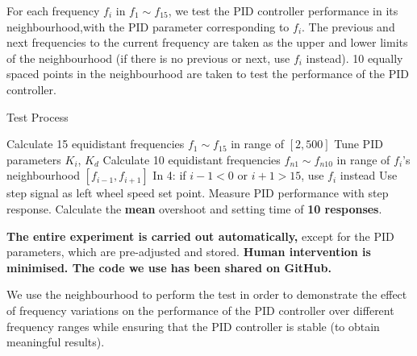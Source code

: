 \documentclass[conference]{IEEEtran}
\begin{document}

For each frequency $f_{i}$ in $f_{1}\sim f_{15}$, we test the PID controller performance in its neighbourhood,with the PID parameter corresponding to $f_{i}$. The previous and next frequencies to the current frequency are taken as the upper and lower limits of the neighbourhood (if there is no previous or next, use $f_{i}$ instead). 10 equally spaced points in the neighbourhood are taken to test the performance of the PID controller.

\begin{algorithm}
	\caption{Test Process}\label{TestMethod}
	\begin{algorithmic}[1]
        \State Calculate 15  equidistant frequencies $f_{1}\sim f_{15}$ in range of $[2,500]$
                \State Tune PID parameters $K_{i}$, $K_{d}$
                \State Calculate 10 equidistant frequencies $f_{n1}\sim f_{n10}$ in range of $f_{i}$'s neighbourhood $[f_{i-1},f_{i+1}]$
                \State In 4: if $i-1<0$ or $i+1>15$, use $f_{i}$ instead
				\State Use step signal as left wheel speed set point.
                \State Measure PID performance with step response.
                \State Calculate the \textbf{mean} overshoot and setting time of \textbf{10 responses}.
			\EndFor
		\EndFor
	\end{algorithmic} 
\end{algorithm}

 \textbf{The entire experiment is carried out automatically,} except for the PID parameters, which are pre-adjusted and stored. \textbf{Human intervention is minimised. The code we use has been shared on GitHub.} 
 
We use the neighbourhood to perform the test in order to demonstrate the effect of frequency variations on the performance of the PID controller over different frequency ranges while ensuring that the PID controller is stable (to obtain meaningful results).
\end{document}
